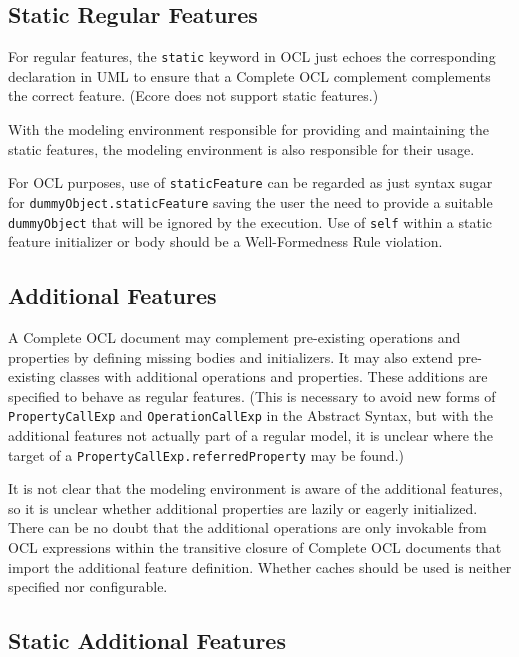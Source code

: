 \documentclass[sigconf]{acmart}
\begin{document}
\subsection{Static Regular Features}

For regular features, the \verb|static| keyword in OCL just echoes the corresponding declaration in UML to ensure that a Complete OCL complement complements the correct feature. (Ecore does not support static features.)

With the modeling environment responsible for providing and maintaining the static features, the modeling environment is also responsible for their usage.

For OCL purposes, use of \verb|staticFeature| can be regarded as just syntax sugar for \verb|dummyObject.staticFeature| saving the user the need to provide a suitable \verb|dummyObject| that will be ignored by the execution. Use of \verb|self| within a static feature initializer or body should be a Well-Formedness Rule violation.

\subsection{Additional Features}

A Complete OCL document may complement pre-existing operations and properties by defining missing bodies and initializers. It may also extend pre-existing classes with additional operations and properties. These additions are specified to behave as regular features. (This is necessary to avoid new forms of \verb|PropertyCallExp| and \verb|OperationCallExp| in the Abstract Syntax, but with the additional features not actually part of a regular model, it is unclear where the target of a \verb|PropertyCallExp.referredProperty| may be found.)

It is not clear that the modeling environment is aware of the additional features, so it is unclear whether additional properties are lazily or eagerly initialized. There can be no doubt that the additional operations are only invokable from OCL expressions within the transitive closure of Complete OCL documents that import the additional feature definition. Whether caches should be used is neither specified nor configurable.

\subsection{Static Additional Features}
\end{document}
